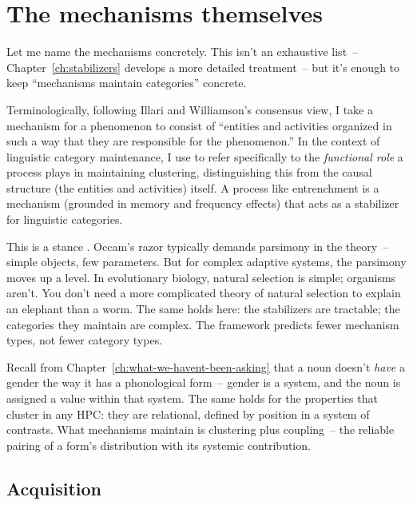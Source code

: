 \section{The mechanisms themselves}
\label{sec:4:the-mechanisms}

Let me name the mechanisms concretely. This isn't an exhaustive list~-- Chapter~\ref{ch:stabilizers} develops a more detailed treatment~-- but it's enough to keep \enquote{mechanisms maintain categories} concrete.

Terminologically, following Illari and Williamson's \textcite{illari2012} consensus view, I take a mechanism for a phenomenon to consist of \enquote{entities and activities organized in such a way that they are responsible for the phenomenon.} In the context of linguistic category maintenance, I use  to refer specifically to the \emph{functional role} a process plays in maintaining clustering, distinguishing this from the causal structure (the entities and activities) itself. A process like entrenchment is a mechanism (grounded in memory and frequency effects) that acts as a stabilizer for linguistic categories.

This is a  stance \parencite{krakauer2023}. Occam's razor typically demands parsimony in the theory~-- simple objects, few parameters. But for complex adaptive systems, the parsimony moves up a level. In evolutionary biology, natural selection is simple; organisms aren't. You don't need a more complicated theory of natural selection to explain an elephant than a worm. The same holds here: the stabilizers are tractable; the categories they maintain are complex. The framework predicts fewer mechanism types, not fewer category types.

Recall from Chapter~\ref{ch:what-we-havent-been-asking} that a noun doesn't \emph{have} a gender the way it has a phonological form~-- gender is a system, and the noun is assigned a value within that system. The same holds for the properties that cluster in any HPC: they are relational, defined by position in a system of contrasts. What mechanisms maintain is clustering plus coupling~-- the reliable pairing of a form's distribution with its systemic contribution.

\subsection{Acquisition}
\label{subsec:4:acquisition}

